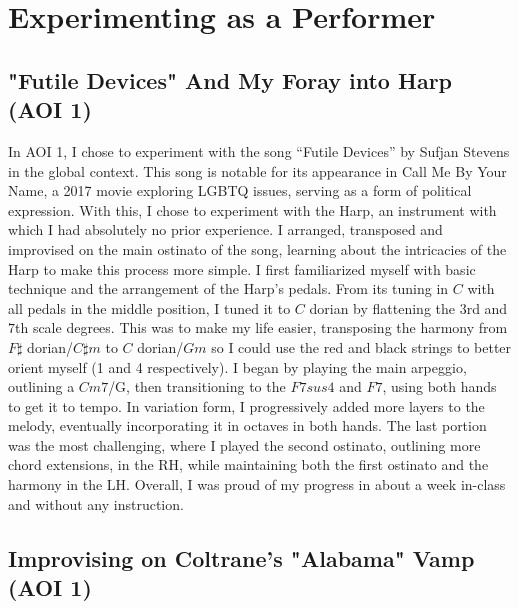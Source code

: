 \documentclass[12pt]{article}
\begin{document}
\section{Experimenting as a Performer}

\subsection{"Futile Devices" And My Foray into  Harp (AOI 1)}

In AOI 1, I chose to experiment with the song “Futile Devices” by Sufjan Stevens in the global context. This song is notable for its appearance in Call Me By Your Name, a 2017 movie exploring LGBTQ issues, serving as a form of political expression.\autocite{harten_2018} With this, I chose to experiment with the Harp, an instrument with which I had absolutely no prior experience. I arranged, transposed and improvised on the main ostinato of the song, learning about the intricacies of the Harp to make this process more simple. I first familiarized myself with basic technique and the arrangement of the Harp’s pedals. From its tuning in $C$ with all pedals in the middle position, I tuned it to $C$ dorian by flattening the $3$rd and $7$th scale degrees. This was to make my life easier, transposing the harmony from $F\sharp$ dorian/$C\sharp m$ to $C$ dorian/$Gm$ so I could use the red and black strings to better orient myself (1 and 4 respectively). I began by playing the main arpeggio, outlining a $Cm7$/G, then transitioning to the $F7sus4$ and $F7$, using both hands to get it to tempo. In variation form, I progressively added more layers to the melody, eventually incorporating it in octaves in both hands. The last portion was the most challenging, where I played the second ostinato, outlining more chord extensions, in the RH, while maintaining both the first ostinato and the harmony in the LH. Overall, I was proud of my progress in about a week in-class and without any instruction.


\subsection{Improvising on Coltrane's "Alabama" Vamp (AOI 1)}
\end{document}
